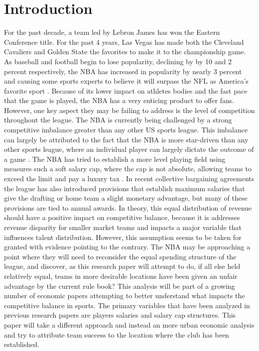 \documentclass[12pt,english]{article}
\begin{document}
\section{Introduction}\label{sec:intro}
For the past decade, a team led by Lebron James has won the Eastern Conference title. For the past 4 years, Las Vegas has made both the Cleveland Cavaliers and Golden State the favorites to make it to the championship game. As baseball and football begin to lose popularity, declining by by 10 and 2 percent respectively, the NBA has increased in popularity by nearly 3 percent and causing some sports experts to believe it will surpass the NFL as America's favorite sport \cite{abdul}. 
Because of its lower impact on athletes bodies and the fast pace that the game is played, the NBA has a very enticing product to offer fans. However, one key aspect they may be failing to address is the level of competition throughout the league. The NBA is currently being challenged by a strong competitive imbalance greater than any other US sports league. This imbalance can largely be attributed to the fact that the NBA is more star-driven than any other sports league, where an individual player can largely dictate the outcome of a game \cite{abdul}. The NBA has tried to establish a more level playing field using measures such a soft salary cap, where the cap is not absolute, allowing teams to exceed the limit and pay a luxury tax \cite{gomez}. In recent collective bargaining agreements the league has also introduced provisions that establish maximum salaries that give the drafting or home team a slight monetary advantage, but many of these provisions are tied to annual awards.
In theory, this equal distribution of revenue should have a positive impact on competitive balance, because it is addresses revenue disparity for smaller market teams and impacts a major variable that influences talent distribution. However, this assumption seems to be taken for granted with evidence pointing to the contrary. 
\newline
The NBA may be approaching a point where they will need to reconsider the equal spending structure of the league, and discover, as this research paper will attempt to do, if all else held relatively equal, teams in more desirable locations have been given an unfair advantage by the current rule book?
This analysis will be part of a growing number of economic papers attempting to better understand what impacts the competitive balance in sports. The primary variables that have been analyzed in previous research papers are players salaries and salary cap structures. This paper will take a different approach and instead an more urban economic analysis and try to attribute team success to the location where the club has been established. 
\end{document}
